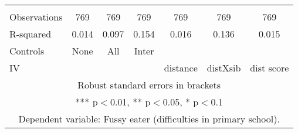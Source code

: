 \begin{tabular}{lcccccc}
 &  &  &  &  &  &  \\
Observations & 769 & 769 & 769 & 769 & 769 & 769 \\
R-squared & 0.014 & 0.097 & 0.154 & 0.016 & 0.136 & 0.015 \\
Controls & None & All & Inter &  &  &  \\
 IV &  &  &  & distance & distXsib & dist score \\ \hline
\multicolumn{7}{c}{ Robust standard errors in brackets} \\
\multicolumn{7}{c}{ *** p$<$0.01, ** p$<$0.05, * p$<$0.1} \\
\multicolumn{7}{c}{ Dependent variable: Fussy eater (difficulties in primary school).} \\
\end{tabular}
